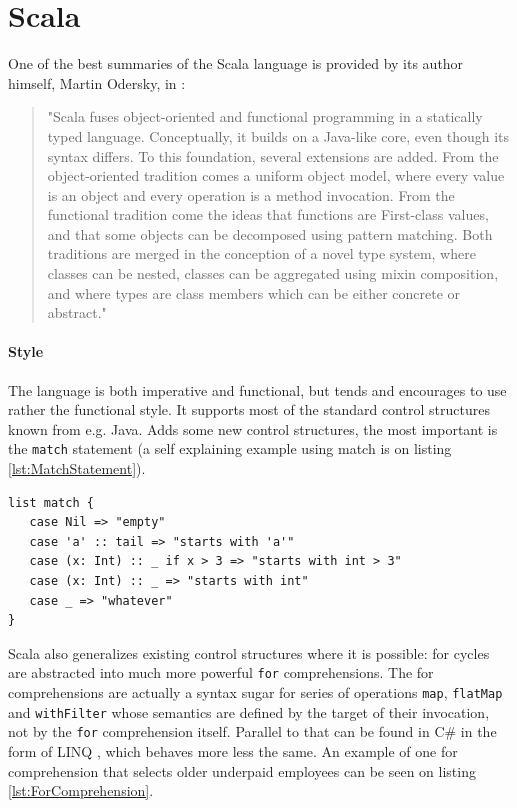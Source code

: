 \documentclass[12pt,a4paper]{report}
\begin{document}
\section{Scala}

One of the best summaries of the Scala language is provided by its author himself, Martin Odersky, in  \cite{ScalableComponents}:

\begin{quote}
"Scala fuses object-oriented and functional programming in a statically typed language. Conceptually, it builds on a Java-like core, even though its syntax differs. To this foundation, several extensions are added. From the object-oriented tradition comes a uniform object model, where every value is an object and every operation is a method invocation. From the functional tradition come the ideas that functions are First-class values, and that some objects can be decomposed using pattern matching. Both traditions are merged in the conception of a novel type system, where classes can be nested, classes can be aggregated using mixin composition, and where types are class members which can be either concrete or abstract."
\end{quote}

\paragraph{Style} The language is both imperative and functional, but tends and encourages to use rather the functional style. It supports most of the standard control structures known from e.g. Java. Adds some new control structures, the most important is the \texttt{match} statement (a self explaining example using match is on listing \ref{lst:MatchStatement}).

\begin{lstlisting}[caption={Match statement example.},label={lst:MatchStatement}]
list match {
   case Nil => "empty"
   case 'a' :: tail => "starts with 'a'"
   case (x: Int) :: _ if x > 3 => "starts with int > 3"
   case (x: Int) :: _ => "starts with int"
   case _ => "whatever"
}
\end{lstlisting}

Scala also generalizes existing control structures where it is possible: for cycles are abstracted into much more powerful \texttt{for} comprehensions. The for comprehensions are actually a syntax sugar for series of operations \texttt{map}, \texttt{flatMap} and \texttt{withFilter} whose semantics are defined by the target of their invocation, not by the \texttt{for} comprehension itself. Parallel to that can be found in C\# in the form of LINQ \cite{Linq}, which behaves more less the same. An example of one for comprehension that selects older underpaid employees can be seen on listing \ref{lst:ForComprehension}.
\end{document}
